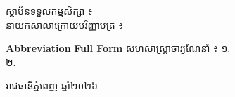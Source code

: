\begin{titlepage}
  {\khmerfont\normalsize {ស្ថាប័នទទួលកម្មសិក្សា ៖ \hostInstitutionKH}}\\[0.5cm]
  {\khmerfont\normalsize {នាយកសាលាក្រោយបរិញ្ញាបត្រ ៖ \directorNameKH \underline{\hspace{3cm}}}}


  \begin{tabbing}
  \textbf{Abbreviation} \hspace{3cm} \= \textbf{Full Form} \kill
  {\khmerfont\normalsize{សហសាស្ត្រាចារ្យណែនាំ ៖}} \>  {\khmerfont\normalsize{១. \supervisorNameKH \underline{\hspace{4cm}}}}\\[0.5cm]
  \>  {\khmerfont\normalsize{២. \cosupervisorNameKH \underline{\hspace{4cm}}}}\\[0.5cm]
  \end{tabbing}

  \vfill

  \begin{center}
    {\khmerfont\small{រាជធានីភ្នំពេញ ឆ្នាំ២០២៦}}
  \end{center}

\end{titlepage}

\clearpage
